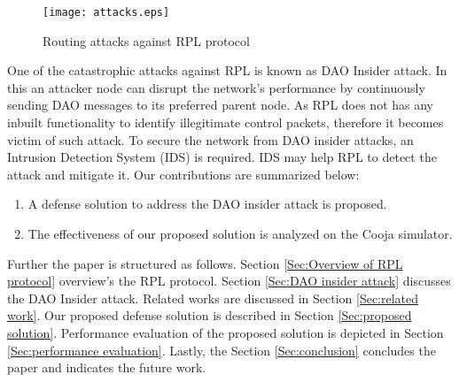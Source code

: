 \documentclass[conference, a4paper]{IEEEtran}
\begin{document}
\begin{figure}
     \centering
     \texttt{[image: attacks.eps]}
     \caption{Routing attacks against RPL protocol}
     \label{fig:attacks}
\end{figure}

One of the catastrophic attacks against RPL is known as DAO Insider attack. In this an attacker node can disrupt the network's performance by continuously sending DAO messages to its preferred parent node. As RPL does not has any inbuilt functionality to identify illegitimate control packets, therefore it becomes victim of such attack. To secure the network from DAO insider attacks, an Intrusion Detection System (IDS) is required. IDS may help RPL to detect the attack and mitigate it. Our contributions are summarized below:

\begin{enumerate}
\item A defense solution to address the DAO insider attack is proposed.
\item The effectiveness of our proposed solution is analyzed on the Cooja simulator.
\end{enumerate}

Further the paper is structured as follows. Section \ref{Sec:Overview of RPL protocol} overview's the RPL protocol. Section \ref{Sec:DAO insider attack} discusses the DAO Insider attack. Related works are discussed in Section \ref{Sec:related work}. Our proposed defense solution is described in Section \ref{Sec:proposed solution}. Performance evaluation of the proposed solution is depicted in Section \ref{Sec:performance evaluation}. Lastly, the Section \ref{Sec:conclusion} concludes the paper and indicates the future work.
 
\end{document}
